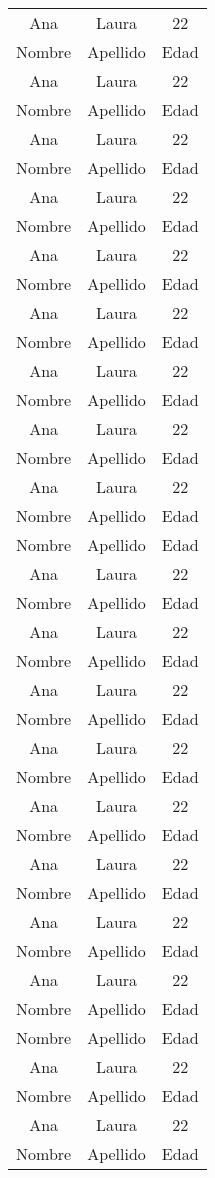 \documentclass{article}
\begin{document}
\begin{longtable}{c c c}
	Ana & Laura & 22 \\
	Nombre & Apellido & Edad \\
	Ana & Laura & 22 \\
	Nombre & Apellido & Edad \\
	Ana & Laura & 22 \\
	Nombre & Apellido & Edad \\
	Ana & Laura & 22 \\	
	Nombre & Apellido & Edad \\
	Ana & Laura & 22 \\
	Nombre & Apellido & Edad \\
	Ana & Laura & 22 \\
	Nombre & Apellido & Edad \\
	Ana & Laura & 22 \\
	Nombre & Apellido & Edad \\
	Ana & Laura & 22 \\
	Nombre & Apellido & Edad \\
	Ana & Laura & 22 \\
	Nombre & Apellido & Edad \\
	Nombre & Apellido & Edad \\
	Ana & Laura & 22 \\
	Nombre & Apellido & Edad \\
	Ana & Laura & 22 \\
	Nombre & Apellido & Edad \\
	Ana & Laura & 22 \\	
	Nombre & Apellido & Edad \\
	Ana & Laura & 22 \\
	Nombre & Apellido & Edad \\
	Ana & Laura & 22 \\
	Nombre & Apellido & Edad \\
	Ana & Laura & 22 \\
	Nombre & Apellido & Edad \\
	Ana & Laura & 22 \\
	Nombre & Apellido & Edad \\
	Ana & Laura & 22 \\
	Nombre & Apellido & Edad \\
	Nombre & Apellido & Edad \\
	Ana & Laura & 22 \\
	Nombre & Apellido & Edad \\
	Ana & Laura & 22 \\
	Nombre & Apellido & Edad \\

\end{longtable}
\end{document}
